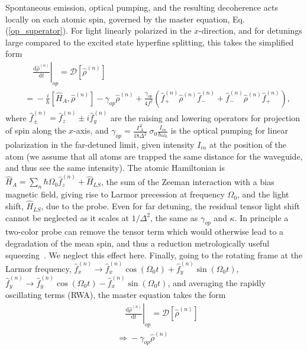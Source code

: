 \documentclass[aps,pra,twocolumn,superscriptaddress]{revtex4-1} %
\newcommand{\dt}[1]{\frac{{\mathrm d} {#1}}{{\mathrm d}t}}
\newcommand{\nn}{\nonumber}
\begin{document}
\begin{appendix}
Spontaneous emission, optical pumping, and the resulting decoherence acts locally on each atomic spin, governed by the master equation, Eq. (\ref{op_superator}).  For light linearly polarized in the $x$-direction, and for detunings large compared to the excited state hyperfine splitting, this takes the simplified form~\cite{Deutsch2010a}
\begin{align}
&\quad\left.\dt{\hat{\rho}^{(n)}}\right|_{op} =\mathcal{D}[\hat{\rho}^{(n)}]\nn\\
&=\!\!  -\frac{i}{\hbar}\![ \hat{H}\!\!_A, \hat{\rho}^{(\!n\!)}] \!\!-\! {\gamma_{op}}\hat{\rho}^{(\!n\!)} \!\!+\!\!\frac{\gamma_{op}}{4 f^2}\!\! \left(\!\hat{f}^{(\!n\!)}_+  \!\hat{\rho}^{(\!n\!)}\!  \hat{f}^{(\!n\!)}_- \!\!+\!\! \hat{f}^{(\!n\!)}_-\! \hat{\rho}^{(\!n\!)}\!  \hat{f}^{(\!n\!)}_+\!\right)\!\!,\label{eq:op_master}
\end{align}
where $\hat{f}^{(n)}_\pm = \hat{f}^{(n)}_z \pm i \hat{f}^{(n)}_y$ are the raising and lowering operators for projection of spin along the $x$-axis, and $\gamma_{op} = \frac{\Gamma_A^2}{18 \Delta^2}\;\sigma_0 \frac{I_{in}}{\hbar \omega_0}$ is the optical pumping for linear polarization in the far-detuned limit, given intensity $I_{in}$ at the position of the atom (we assume that all atoms are trapped the same distance for the waveguide, and thus see the same intensity). The atomic Hamiltonian is $\hat{H}_A = \sum_n \hbar \Omega_0 \hat{f}^{(n)}_z + \hat{H}_{LS}$, the sum of the Zeeman interaction with a bias magnetic field, giving rise to Larmor precession at frequency $\Omega_0$, and the light shift, $\hat{H}_{LS}$, due to the probe.  Even for far detuning, the residual tensor light shift cannot be neglected as it scales at $1/\Delta^2$, the same as $\gamma_{op}$ and $\kappa$.  In principle a two-color probe can remove the tensor term which would otherwise lead to a degradation of the mean spin, and thus a reduction metrologically useful squeezing~\cite{Saffman2009,Montano2015Quantum}.  We neglect this effect here.  Finally, going to the rotating frame at the Larmor frequency, $\hat{f}^{(n)}_x \rightarrow \hat{f}^{(n)}_x \cos(\Omega_0 t) + \hat{f}^{(n)}_y \sin(\Omega_0 t)$,  $\hat{f}^{(n)}_y \rightarrow \hat{f}^{(n)}_y \cos(\Omega_0 t) - \hat{f}^{(n)}_x \sin(\Omega_0 t)$, and averaging the rapidly oscillating terms (RWA), the master equation takes the form
\begin{align}
&\quad\left.\dt{\hat{\rho}^{(n)}}\right|_{op}= \mathcal{D}[\hat{\rho}^{(n)}]\nn\\ 
&\Rightarrow  \!-{\gamma_{op}} \hat{\rho}^{(n)}\nn\\ 

\end{align}
\end{appendix}
\end{document}

